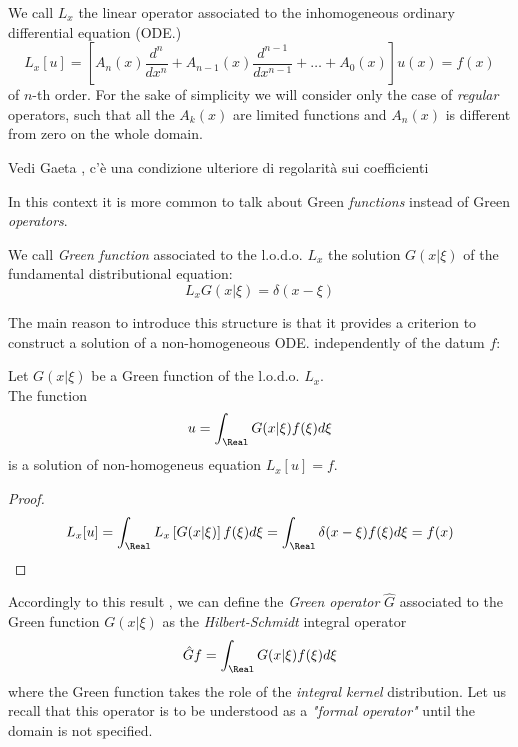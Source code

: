 \documentclass[Main]{subfiles}
\begin{document}
	We call $L_x$ the linear operator associated to the inhomogeneous ordinary differential equation (ODE.)
	\begin{displaymath}
		L_x [u] = \left[ A_n(x) \frac{d^n}{dx^n} + A_{n-1}(x) \frac{d^{n-1}}{dx^{n-1}} + \ldots + A_0(x) \right] u(x) = f(x)
	\end{displaymath}
	of $n$-th order.
	For the sake of simplicity we will consider only the case of \emph{regular} operators, such that all the $A_k(x)$ are limited functions and $A_n(x)$ is different from zero on the whole domain.
	\ifToninus \begin{Warning}
		Vedi Gaeta \cite{Gaeta2014}, c'è una condizione ulteriore di regolarità sui coefficienti
	\end{Warning} \fi

	In this context it is more common to talk about Green \textit{functions} instead of Green \textit{operators}.
	\begin{definition}
	We call \emph{Green function} associated to the l.o.d.o. $L_x$ the solution $G(x \vert \xi)$ of the fundamental distributional equation:
	\begin{equation}\label{Eq:FundamentalGreen}
		L_x G(x\vert\xi) = \delta(x-\xi)
	\end{equation}
	\end{definition}
	The main reason to introduce this structure is that it provides a criterion to construct a solution of a non-homogeneous ODE. independently of the datum $f$:
	\begin{proposition}
		Let $G(x \vert \xi)$ be a Green function of the l.o.d.o. $L_x$.\\
		The function
		\begin{displaymath}
			u = \int_\Real G( x \vert \xi) f(\xi) d\xi
		\end{displaymath}
		is a solution of non-homogeneus equation $L_x[u] = f$.
	\end{proposition}
	\begin{proof}
		\begin{displaymath}
			L_x[u] = \int_\Real L_x\left[ G(x \vert \xi ) \right] f(\xi) d\xi = \int_\Real \delta(x -\xi) f(\xi) d\xi = f(x)
		\end{displaymath}
	\end{proof}
	Accordingly to this result , we can define the \emph{Green operator} $\hat{G}$ associated to the Green function $G(x \vert \xi)$ as the \emph{Hilbert-Schmidt} integral operator
			\begin{displaymath}
				\hat{G} f = \int_\Real G( x \vert \xi ) f(\xi) d\xi
			\end{displaymath}
	where the Green function takes the role of the \emph{integral kernel} distribution.
	Let us recall that this operator is to be understood as a \emph{"formal operator"} until the domain is not specified.
\end{document}
